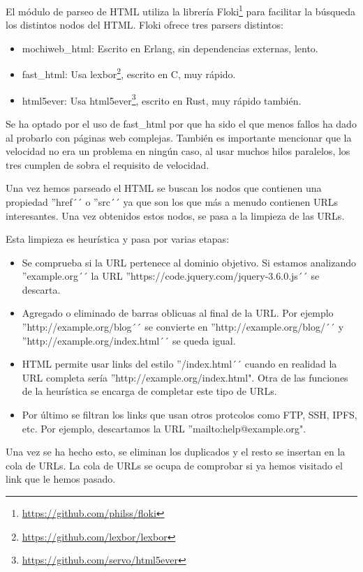El módulo de parseo de HTML utiliza la librería Floki\footnote{\url{https://github.com/philss/floki}} para facilitar la búsqueda los distintos nodos del HTML. Floki ofrece tres parsers distintos:

\begin{itemize}
  \item mochiweb\_html: Escrito en Erlang, sin dependencias externas, lento.
  \item fast\_html: Usa lexbor\footnote{\url{https://github.com/lexbor/lexbor}}, escrito en C, muy rápido.
  \item html5ever: Usa html5ever\footnote{\url{https://github.com/servo/html5ever}}, escrito en Rust, muy rápido también.
\end{itemize}

Se ha optado por el uso de fast\_html por que ha sido el que menos fallos ha dado al probarlo con páginas web complejas. También es importante mencionar que la velocidad no era un problema en ningún caso, al usar muchos hilos paralelos, los tres cumplen de sobra el requisito de velocidad.

Una vez hemos parseado el HTML se buscan los nodos que contienen una propiedad ''href´´ o ''src´´ ya que son los que más a menudo contienen URLs interesantes. Una vez obtenidos estos nodos, se pasa a la limpieza de las URLs.

Esta limpieza es heurística y pasa por varias etapas:

\begin{itemize}
  \item Se comprueba si la URL pertenece al dominio objetivo. Si estamos analizando ''example.org´´ la URL ''https://code.jquery.com/jquery-3.6.0.js´´ se descarta.
  \item Agregado o eliminado de barras oblicuas al final de la URL. Por ejemplo ''http://example.org/blog´´ se convierte en ''http://example.org/blog/´´ y ''http://example.org/index.html´´ se queda igual. 
  \item HTML permite usar links del estilo ''/index.html´´ cuando en realidad la URL completa sería ''http://example.org/index.html". Otra de las funciones de la heurística se encarga de completar este tipo de URLs.
  \item Por último se filtran los links que usan otros protcolos como FTP, SSH, IPFS, etc. Por ejemplo, descartamos la URL ''mailto:help@example.org".
\end{itemize}

Una vez se ha hecho esto, se eliminan los duplicados y el resto se insertan en la cola de URLs. La cola de URLs se ocupa de comprobar si ya hemos visitado el link que le hemos pasado.